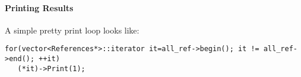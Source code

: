 \paragraph{Printing Results}
A simple pretty print loop looks like:
\begin{footnotesize}
\begin{lstlisting}[frame=single,framerule=0pt]
for(vector<References*>::iterator it=all_ref->begin(); it != all_ref->end(); ++it)
   (*it)->Print(1);
\end{lstlisting}
\end{footnotesize}
% 
% 
% 
% 
% 
